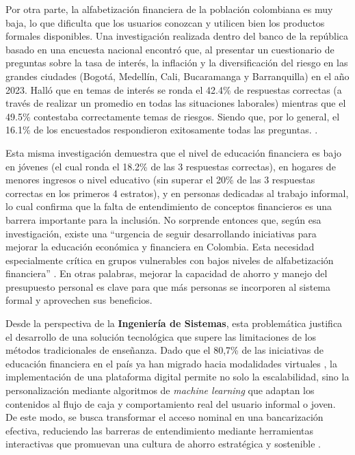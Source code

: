 Por otra parte, la alfabetización financiera de la población colombiana es muy baja, lo que dificulta que los usuarios conozcan y utilicen bien los productos formales disponibles. Una investigación realizada dentro del banco de la república basado en una encuesta nacional encontró que, al presentar un cuestionario de preguntas sobre la tasa de interés, la inflación y la diversificación del riesgo en las grandes ciudades (Bogotá, Medellín, Cali, Bucaramanga y Barranquilla) en el año 2023. Halló que en temas de interés se ronda el 42.4\% de respuestas correctas (a través de realizar un promedio en todas las situaciones laborales) mientras que el 49.5\% contestaba correctamente temas de riesgos. Siendo que, por lo general, el 16.1\% de los encuestados respondieron exitosamente todas las preguntas. \parencite[p.~4]{Departamento01}.

Esta misma investigación demuestra que el nivel de educación financiera es bajo en jóvenes (el cual ronda el 18.2\% de las 3 respuestas correctas), en hogares de menores ingresos o nivel educativo (sin superar el 20\% de las 3 respuestas correctas en los primeros 4 estratos), y en personas dedicadas al trabajo informal, lo cual confirma que la falta de entendimiento de conceptos financieros es una barrera importante para la inclusión. No sorprende entonces que, según esa investigación, existe una ``urgencia de seguir desarrollando iniciativas para mejorar la educación económica y financiera en Colombia. Esta necesidad especialmente crítica en grupos vulnerables con bajos niveles de alfabetización financiera'' \parencite[p.~5-7]{Departamento01}. En otras palabras, mejorar la capacidad de ahorro y manejo del presupuesto personal es clave para que más personas se incorporen al sistema formal y aprovechen sus beneficios.

Desde la perspectiva de la \textbf{Ingeniería de Sistemas}, esta problemática justifica el desarrollo de una solución tecnológica que supere las limitaciones de los métodos tradicionales de enseñanza. Dado que el 80,7\% de las iniciativas de educación financiera en el país ya han migrado hacia modalidades virtuales \parencite[p.~10]{Banrep_Mapeo2024}, la implementación de una plataforma digital permite no solo la escalabilidad, sino la personalización mediante algoritmos de \textit{machine learning} que adaptan los contenidos al flujo de caja y comportamiento real del usuario informal o joven. De este modo, se busca transformar el acceso nominal en una bancarización efectiva, reduciendo las barreras de entendimiento mediante herramientas interactivas que promuevan una cultura de ahorro estratégica y sostenible \parencite[p.~7]{Departamento01}.

